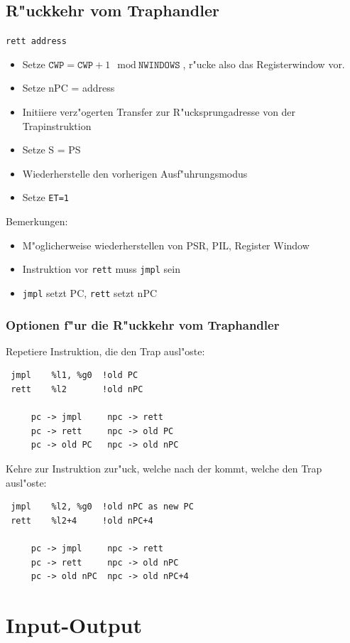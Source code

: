 \documentclass[german, 10pt, a4paper, twocolumn]{scrartcl}
\begin{document}
\subsection{R"uckkehr vom Traphandler}

\verb#rett address#
\begin{itemize}
	\item Setze $\texttt{CWP} = \texttt{CWP}+1 \mod \texttt{NWINDOWS}$, r"ucke also das Registerwindow vor.
	\item Setze nPC = address
	\item Initiiere verz"ogerten Transfer zur R"ucksprungadresse von der Trapinstruktion
	\item Setze S = PS
	\item Wiederherstelle den vorherigen Ausf"uhrungsmodus
	\item Setze \texttt{ET=1}
\end{itemize}

Bemerkungen:
\begin{itemize}
	\item M"oglicherweise wiederherstellen von PSR, PIL, Register Window
	\item Instruktion vor \verb#rett# muss \verb#jmpl# sein
	\item \verb#jmpl# setzt PC, \verb#rett# setzt nPC
\end{itemize}

\subsubsection{Optionen f"ur die R"uckkehr vom Traphandler}

Repetiere Instruktion, die den Trap ausl"oste:
\begin{verbatim}
 jmpl    %l1, %g0  !old PC
 rett    %l2       !old nPC

     pc -> jmpl     npc -> rett
     pc -> rett     npc -> old PC
     pc -> old PC   npc -> old nPC
\end{verbatim}

Kehre zur Instruktion zur"uck, welche nach der kommt, welche den Trap ausl"oste:
\begin{verbatim}
 jmpl    %l2, %g0  !old nPC as new PC
 rett    %l2+4     !old nPC+4

     pc -> jmpl     npc -> rett
     pc -> rett     npc -> old nPC
     pc -> old nPC  npc -> old nPC+4
\end{verbatim}

\section{Input-Output}
\end{document}
